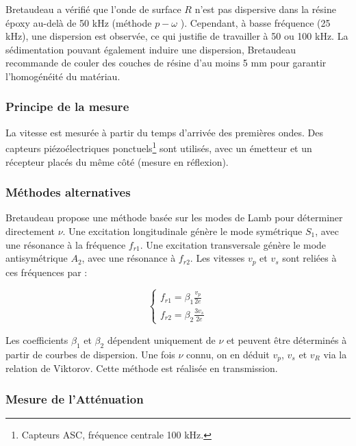 Bretaudeau a vérifié que l’onde de surface $R$ n’est pas dispersive dans la résine époxy au-delà de 50 kHz (méthode $p-\omega$ \cite{Mokhtar1988, Yilmaz}). Cependant, à basse fréquence (25 kHz), une dispersion est observée, ce qui justifie de travailler à 50 ou 100 kHz. La sédimentation pouvant également induire une dispersion, Bretaudeau recommande de couler des couches de résine d'au moins 5 mm pour garantir l’homogénéité du matériau.

\subsubsection*{Principe de la mesure}

La vitesse est mesurée à partir du temps d’arrivée des premières ondes. Des capteurs piézoélectriques ponctuels\footnote{Capteurs ASC, fréquence centrale 100 kHz.} sont utilisés, avec un émetteur et un récepteur placés du même côté (mesure en réflexion). 

\subsubsection*{Méthodes alternatives}

Bretaudeau propose une méthode basée sur les modes de Lamb pour déterminer directement $\nu$. Une excitation longitudinale génère le mode symétrique $S_1$, avec une résonance à la fréquence $f_{r1}$. Une excitation transversale génère le mode antisymétrique $A_2$, avec une résonance à $f_{r2}$. Les vitesses $v_p$ et $v_s$ sont reliées à ces fréquences par :

\begin{equation}
    \begin{cases}
         f_{r1} = \beta_1 \frac{v_p}{2e} \\
         f_{r2} = \beta_2 \frac{3v_s}{2e}
    \end{cases}
\end{equation}

Les coefficients $\beta_1$ et $\beta_2$ dépendent uniquement de $\nu$ et peuvent être déterminés à partir de courbes de dispersion. Une fois $\nu$ connu, on en déduit $v_p$, $v_s$ et $v_R$ via la relation de Viktorov. Cette méthode est réalisée en transmission.


\subsubsection{Mesure de l'Atténuation}

